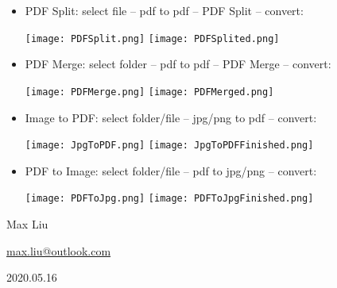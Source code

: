 \documentclass[11pt]{article}
\begin{document}
\begin{itemize}
\item PDF Split: select file -- pdf to pdf -- PDF Split -- convert:

\begin{center}
    \texttt{[image: PDFSplit.png]}
    \texttt{[image: PDFSplited.png]}
\end{center}

\item PDF Merge: select folder -- pdf to pdf -- PDF Merge -- convert:

\begin{center}
    \texttt{[image: PDFMerge.png]}
    \texttt{[image: PDFMerged.png]}
\end{center}

\item Image to PDF: select folder/file -- jpg/png to pdf -- convert:

\begin{center}
    \texttt{[image: JpgToPDF.png]}
    \texttt{[image: JpgToPDFFinished.png]}
\end{center}

\item PDF to Image: select folder/file -- pdf to jpg/png -- convert:

\begin{center}
    \texttt{[image: PDFToJpg.png]}
    \texttt{[image: PDFToJpgFinished.png]}
\end{center}

\end{itemize}
\vspace{12mm}
\begin{flushright}
    Max Liu \par
    \url{max.liu@outlook.com}\par
    2020.05.16   
\end{flushright}
\end{document}
